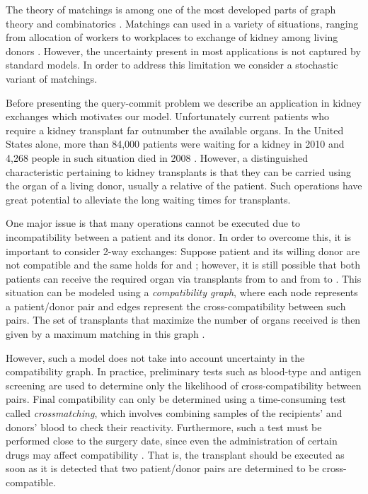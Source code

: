 \documentclass[12pt]{article}
\begin{document}
			The theory of matchings is among one of the most developed parts of graph theory and combinatorics \cite{lovasz}. Matchings can used in a variety of situations, ranging from allocation of workers to workplaces to exchange of kidney among living donors \cite{roth1}. However, the uncertainty present in most applications is not captured by standard models. In order to address this limitation we consider a stochastic variant of matchings.
			
	Before presenting the query-commit problem we describe an application in kidney exchanges which motivates our model. Unfortunately current patients who require a kidney transplant far outnumber the available organs. In the United States alone, more than 84,000 patients were waiting for a kidney in 2010 and 4,268 people in such situation died in 2008 \cite{unos}. However, a distinguished characteristic pertaining to kidney transplants is that they can be carried using the organ of a living donor, usually a relative of the patient. Such operations have great potential to alleviate the long waiting times for transplants. 
	
	One major issue is that many operations cannot be executed due to incompatibility between a patient and its donor. In order to overcome this, it is important to consider 2-way exchanges: Suppose patient  and its willing donor  are not compatible and the same holds for  and ; however, it is still possible that both patients can receive the required organ via transplants from  to  and from  to . This situation can be modeled using a \emph{compatibility graph}, where each node represents a patient/donor pair and edges represent the cross-compatibility between such pairs. The set of transplants that maximize the number of organs received is then given by a maximum matching in this graph \cite{roth1, roth2}. 
	
	However, such a model does not take into account uncertainty in the compatibility graph. In practice, preliminary tests such as blood-type and antigen screening are used to determine only the likelihood of cross-compatibility between pairs. Final compatibility can only be determined using a time-consuming test called \emph{crossmatching}, which involves combining samples of the recipients' and donors' blood to check their reactivity. Furthermore, such a test must be performed close to the surgery date, since even the administration of certain drugs may affect compatibility \cite{crossmatching}. That is, the transplant should be executed as soon as it is detected that two patient/donor pairs are determined to be cross-compatible.
	
\end{document}
